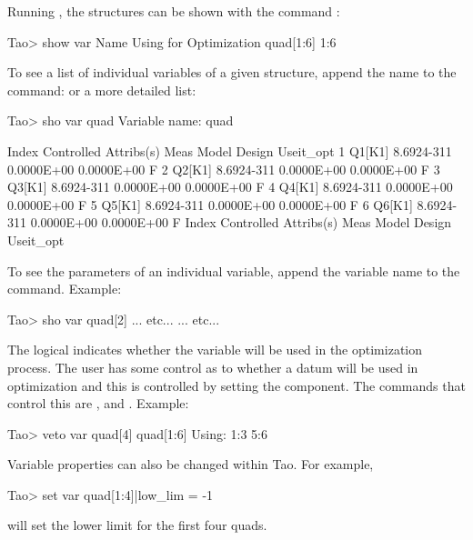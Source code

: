 \documentclass{hitec}
\begin{document}
{Running \tao, the  structures can be shown with the command : 
\begin{code}
Tao> show var
       Name                                      Using for Optimization
    quad[1:6]                                    1:6
\end{code}

To see a list of individual variables of a given  structure, append the 
name to the  command:
or a more detailed list:
\begin{code}
Tao> sho var quad
Variable name:  quad

 Index  Controlled Attribs(s)    Meas         Model        Design  Useit_opt
     1  Q1[K1]               8.6924-311    0.0000E+00    0.0000E+00       F
     2  Q2[K1]               8.6924-311    0.0000E+00    0.0000E+00       F
     3  Q3[K1]               8.6924-311    0.0000E+00    0.0000E+00       F
     4  Q4[K1]               8.6924-311    0.0000E+00    0.0000E+00       F
     5  Q5[K1]               8.6924-311    0.0000E+00    0.0000E+00       F
     6  Q6[K1]               8.6924-311    0.0000E+00    0.0000E+00       F
 Index  Controlled Attribs(s)    Meas         Model        Design  Useit_opt
\end{code}

To see the parameters of an individual variable, append the variable name to the 
command. Example:
\begin{code}
Tao> sho var quad[2]
... etc...
... etc...
\end{code}
The  logical indicates whether the variable will be used in the optimization process.
The user has some control as to whether a datum will be used in optimization and this is controlled
by setting the  component. The commands that control this are ,  and
. Example:
\begin{code}
Tao> veto var quad[4]
  quad[1:6]                                      Using: 1:3 5:6
\begin{code}

Variable properties can also be changed within Tao. For example, 
\begin{code}
Tao> set var quad[1:4]|low_lim = -1
\end{code}
will set the lower limit for the first four quads.


\end{code}
\end{code}}
\end{document}
